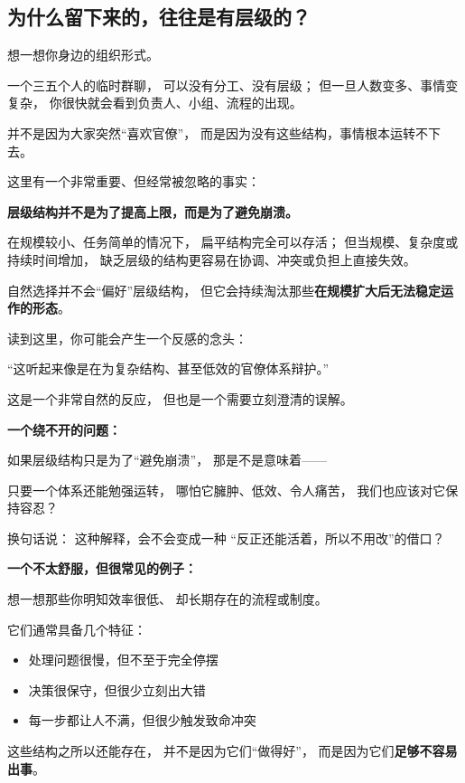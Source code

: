 \documentclass[openany, a4paper, 12pt]{book}
\newcommand{\lowfreq}[1]{\textbf{\textcolor{red!70!black}{#1}}}
\begin{document}
\subsection{为什么留下来的，往往是有层级的？}

\begin{readingnote}
	想一想你身边的组织形式。
	
	一个三五个人的临时群聊，
	可以没有分工、没有层级；
	但一旦人数变多、事情变复杂，
	你很快就会看到负责人、小组、流程的出现。
	
	并不是因为大家突然“喜欢官僚”，
	而是因为没有这些结构，事情根本运转不下去。
\end{readingnote}

这里有一个非常重要、但经常被忽略的事实：

\lowfreq{层级结构并不是为了提高上限，而是为了避免崩溃。}

在规模较小、任务简单的情况下，
扁平结构完全可以存活；
但当规模、复杂度或持续时间增加，
缺乏层级的结构更容易在协调、冲突或负担上直接失效。

自然选择并不会“偏好”层级结构，
但它会持续淘汰那些\lowfreq{在规模扩大后无法稳定运作的形态}。




	\begin{tcolorbox}[colback=yellow!5, title=\textit{读者行为预测}]
		
	读到这里，你可能会产生一个反感的念头：
	
	“这听起来像是在为复杂结构、甚至低效的官僚体系辩护。”
	
	这是一个非常自然的反应，
	但也是一个需要立刻澄清的误解。
\end{tcolorbox}

\begin{readingnote}
	\lowfreq{一个绕不开的问题：}
	
	如果层级结构只是为了“避免崩溃”，
	那是不是意味着——
	
	只要一个体系还能勉强运转，
	哪怕它臃肿、低效、令人痛苦，
	我们也应该对它保持容忍？
	
	换句话说：
	这种解释，会不会变成一种
	“反正还能活着，所以不用改”的借口？
\end{readingnote}

\begin{readingnote}
	\lowfreq{一个不太舒服，但很常见的例子：}
	
	想一想那些你明知效率很低、
	却长期存在的流程或制度。
	
	它们通常具备几个特征：
	\begin{itemize}
		\item 处理问题很慢，但不至于完全停摆
		\item 决策很保守，但很少立刻出大错
		\item 每一步都让人不满，但很少触发致命冲突
	\end{itemize}
	
	这些结构之所以还能存在，
	并不是因为它们“做得好”，
	而是因为它们\lowfreq{足够不容易出事}。
\end{readingnote}
\end{document}
